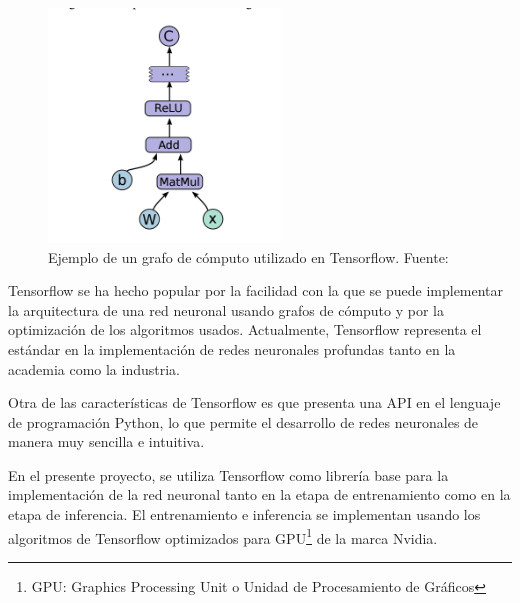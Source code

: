     \begin{figure}[!h] 
        \centering
        \includegraphics[width=0.55\textwidth]{img/grafotf}
        \caption[Ejemplo de un grafo de cómputo utilizado en Tensorflow]{Ejemplo de un grafo de cómputo utilizado en Tensorflow. Fuente: \cite{asjad_2016} }
        \label{fig:grafotf}
    \end{figure}

    Tensorflow se ha hecho popular por la facilidad con la que se puede implementar la arquitectura de una red neuronal usando grafos
    de cómputo y por la optimización de los algoritmos usados. Actualmente, Tensorflow representa el estándar en la implementación de 
    redes neuronales profundas tanto en la academia como la industria. 

    Otra de las características de Tensorflow es que presenta una API en el lenguaje de programación Python, lo que permite el desarrollo
    de redes neuronales de manera muy sencilla e intuitiva. 

    En el presente proyecto, se utiliza Tensorflow como librería base para la implementación de la red neuronal tanto en la etapa de 
    entrenamiento como en la etapa de inferencia. El entrenamiento e inferencia se implementan usando los algoritmos de Tensorflow 
    optimizados para GPU\footnote{GPU: Graphics Processing Unit o Unidad de Procesamiento de Gráficos} de la marca Nvidia.

